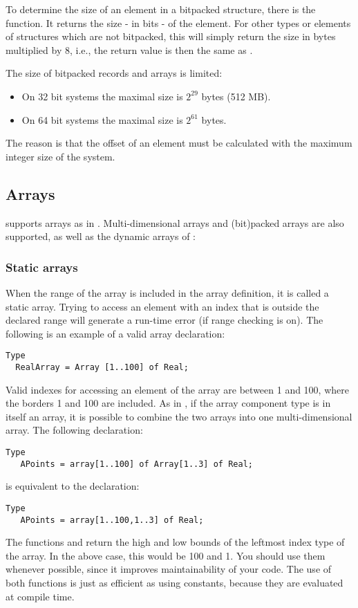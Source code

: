 To determine the size of an element in a bitpacked structure, there is the 
 function. It returns the size - in bits - of the element. 
For other types or elements of structures which are not bitpacked, this will 
simply return the size in bytes multiplied by 8, i.e., the return value is 
then the same as .

The size of bitpacked records and arrays is limited:
\begin{itemize}
\item On 32 bit systems the maximal size is $2^{29}$ bytes (512 MB).
\item On 64 bit systems the maximal size is $2^{61}$ bytes.
\end{itemize}
The reason is that the offset of an element must be calculated with 
the maximum integer size of the system.

%
\subsection{Arrays}
\fpc supports arrays as in \tp. Multi-dimensional arrays and (bit)packed 
arrays are also supported, as well as the dynamic arrays of \delphi:

%
\subsubsection{Static arrays}
 
When the range of the array is included in the array definition, it is
called a static array. Trying to access an element with an index that is
outside the declared range will generate a run-time error (if range checking
is on).  The following is an example of a valid array declaration:
\begin{verbatim}
Type
  RealArray = Array [1..100] of Real;
\end{verbatim}
Valid indexes for accessing an element of the array are between 1 and 100,
where the borders 1 and 100 are included.
As in \tp, if the array component type is in itself an array, it is
possible to combine the two arrays into one multi-dimensional array. The
following declaration:
\begin{verbatim}
Type
   APoints = array[1..100] of Array[1..3] of Real;
\end{verbatim}
is equivalent to the declaration:
\begin{verbatim}
Type
   APoints = array[1..100,1..3] of Real;
\end{verbatim}
The functions  and  return the high and low bounds of
the leftmost index type of the array. In the above case, this would be 100
and 1. You should use them whenever possible, since it improves maintainability
of your code. The use of both functions is just as efficient as using
constants, because they are evaluated at compile time.

